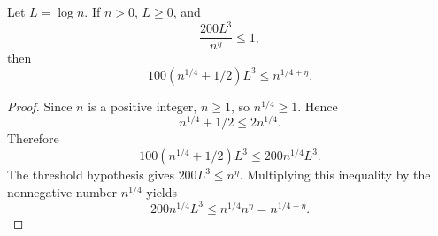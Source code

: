 \begin{helper}
Let \(L=\log n\).  If \(n>0\), \(L\ge0\), and
\[
\frac{200L^3}{n^\eta}\le1,
\]
then
\[
100(n^{1/4}+1/2)L^3\le n^{1/4+\eta}.
\]
\end{helper}
\begin{proof}
Since \(n\) is a positive integer, \(n\ge1\), so \(n^{1/4}\ge1\).  Hence
\[
n^{1/4}+1/2\le2n^{1/4}.
\]
Therefore
\[
100(n^{1/4}+1/2)L^3\le200n^{1/4}L^3.
\]
The threshold hypothesis gives \(200L^3\le n^\eta\).  Multiplying this
inequality by the nonnegative number \(n^{1/4}\) yields
\[
200n^{1/4}L^3\le n^{1/4}n^\eta=n^{1/4+\eta}.
\]
\end{proof}
